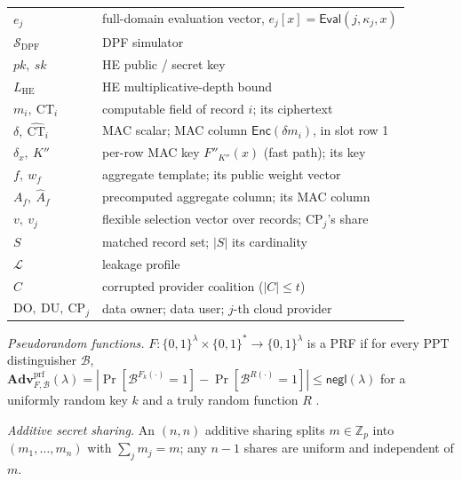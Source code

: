 \documentclass[a4paper,fleqn]{cas-dc}
\newcommand{\negl}{\mathsf{negl}}
\newcommand{\PPT}{\mathrm{PPT}}
\newcommand{\Leak}{\mathcal{L}}
\newcommand{\Sim}{\mathcal{S}}
\newcommand{\Eval}{\mathsf{Eval}}
\newcommand{\Enc}{\mathsf{Enc}}
\newcommand{\advPRF}{\mathbf{Adv}^{\mathrm{prf}}}
\begin{document}
\begin{table}[pos=t]
\begin{tabular}{@{}l>{\raggedright\arraybackslash}p{5.5cm}@{}}
$e_j$ & full-domain evaluation vector, $e_j[x]=\Eval(j,\kappa_j,x)$ \\
$\Sim_{\mathrm{DPF}}$ & DPF simulator \\
$pk,\ sk$ & HE public / secret key \\
$L_{\mathrm{HE}}$ & HE multiplicative-depth bound \\
$m_i,\ \text{CT}_i$ & computable field of record $i$; its ciphertext \\
$\delta,\ \widehat{\text{CT}}_i$ & MAC scalar; MAC column $\Enc(\delta m_i)$,
in slot row 1 \\
$\delta_x,\ K''$ & per-row MAC key $F''_{K''}(x)$ (fast path); its key \\
$f,\ w_f$ & aggregate template; its public weight vector \\
$A_f,\ \widehat{A}_f$ & precomputed aggregate column; its MAC column \\
$v,\ v_j$ & flexible selection vector over records; $\text{CP}_j$'s share \\
$S$ & matched record set; $|S|$ its cardinality \\
$\Leak$ & leakage profile \\
$C$ & corrupted provider coalition ($|C|\le t$) \\
$\mathrm{DO,\ DU},\ \text{CP}_j$ & data owner; data user; $j$-th cloud
provider \\
\bottomrule
\end{tabular}
\end{table}

\emph{Pseudorandom functions.} $F:\{0,1\}^\lambda\times\{0,1\}^*\!\to\!
\{0,1\}^\lambda$ is a PRF if for every $\PPT$ distinguisher $\mathcal{B}$,
$\advPRF_{F,\mathcal{B}}(\lambda)=|\Pr[\mathcal{B}^{F_k(\cdot)}=1]-
\Pr[\mathcal{B}^{R(\cdot)}=1]|\le\negl(\lambda)$ for a uniformly random key
$k$ and a truly random function $R$ \citep{goldreich2019construct}.

\emph{Additive secret sharing.} An $(n,n)$ additive sharing splits
$m\in\mathbb{Z}_p$ into $(m_1,\dots,m_n)$ with $\sum_j m_j=m$; any $n-1$
shares are uniform and independent of $m$.
\end{document}
